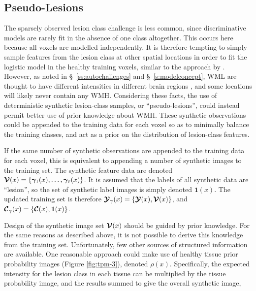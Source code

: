 \subsection{Pseudo-Lesions}\label{ss:meth-pseudo}
The sparsely observed lesion class challenge is less common, since discriminative models are rarely fit in the absence of one class altogether.
This occurs here because all voxels are modelled independently.
It is therefore tempting to simply sample features from the lesion class at other spatial locations in order to fit the logistic model in the healthy training voxels, similar to the approach by \citeauthor{Schmidt2017a}.
However, as noted in \S\ \ref{ss:autochallenges} and \S\ \ref{s:modelconcept}, WML are thought to have different intensities in different brain regions \cite{Sled2004,Stevenson2000}, and some locations will likely never contain any WMH.
Considering these facts, the use of deterministic synthetic lesion-class samples, or ``pseudo-lesions'', could instead permit better use of prior knowledge about WMH.
These synthetic observations could be appended to the training data for each voxel so as to minimally balance the training classes, and act as a prior on the distribution of lesion-class features.
\par
If the same number of synthetic observations are appended to the training data for each voxel, this is equivalent to appending a number of synthetic images to the training set.
The synthetic feature data are denoted
$\bm{\mathcal{V}}(x) = \{\bm{\gamma}_{1}(x),\dots,\bm{\gamma}_{\textsc{v}}(x)\}$.
It is assumed that the labels of all synthetic data are ``lesion'', so the set of synthetic label images is simply denoted $\bm{1}(x)$.
The updated training set is therefore $\bm{\mathcal{Y}}_{\gamma}(x) = \{\bm{\mathcal{Y}}(x),\bm{\mathcal{V}}(x)\}$, and $\bm{\mathcal{C}}_{\gamma}(x) = \{\bm{\mathcal{C}}(x),\bm{1}(x)\}$.
\par
Design of the synthetic image set $\bm{\mathcal{V}}(x)$ should be guided by prior knowledge.
For the same reasons as described above, it is not possible to derive this knowledge from the training set.
Unfortunately, few other sources of structured information are available.
One reasonable approach could make use of healthy tissue prior probability images (Figure \ref{fig:tpm-3}), denoted $\rho(x)$.
Specifically, the expected intensity for the lesion class in each tissue can be multiplied by the tissue probability image, and the results summed to give the overall synthetic image,
